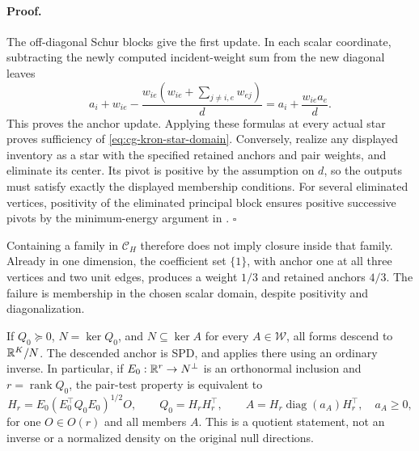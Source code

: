 \paragraph{Proof.}
The off-diagonal Schur blocks give the first update. In each scalar
coordinate, subtracting the newly computed incident-weight sum from the
new diagonal leaves
\begin{equation}
a_i+w_{ie}
-\frac{w_{ie}(w_{ie}+\sum_{j\ne i,e}w_{ej})}{d}
=a_i+\frac{w_{ie}a_e}{d}.
\label{eq:cg-kron-scalar-anchor-remainder}
\end{equation}
This proves the anchor update. Applying these formulas at every actual
star proves sufficiency of \eqref{eq:cg-kron-star-domain}. Conversely,
realize any displayed inventory as a star with the specified retained
anchors and pair weights, and eliminate its center. Its pivot is
positive by the assumption on \(d\), so the outputs must satisfy exactly
the displayed membership conditions. For several eliminated vertices,
positivity of the eliminated principal block ensures positive successive
pivots by the minimum-energy argument in
. \(\square\)

Containing a family in \(\mathcal C_H\) therefore does not imply closure
inside that family. Already in one dimension, the coefficient set
\(\{1\}\), with anchor one at all three vertices and two unit edges,
produces a weight \(1/3\) and retained anchors \(4/3\).
The failure is membership in the chosen scalar domain, despite positivity
and diagonalization. 

If \(Q_0\succeq0\), \(N=\ker Q_0\), and
\(N\subseteq\ker A\) for every \(A\in\mathscr W\), all forms descend
to \(\mathbb R^K/N\). The descended anchor is SPD, and
 applies there using an
ordinary inverse. In particular, if \(E_0:\mathbb R^r\to N^\perp\) is an
orthonormal inclusion and \(r=\operatorname{rank}Q_0\), the pair-test
property is equivalent to
\begin{equation}
H_r=E_0(E_0^\top Q_0E_0)^{1/2}O,\qquad
Q_0=H_rH_r^\top,\qquad
A=H_r\operatorname{diag}(a_A)H_r^\top,\quad a_A\geq0,
\label{eq:cg-kron-quotient-cone}
\end{equation}
for one \(O\in O(r)\) and all members \(A\).
This is a quotient statement, not an inverse or a normalized density on
the original null directions. 

